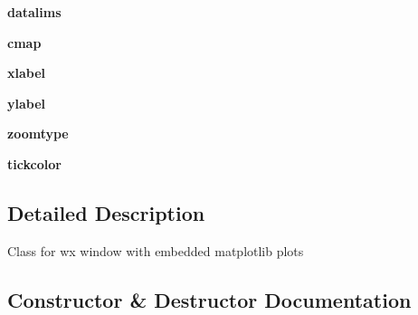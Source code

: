 \begin{DoxyCompactItemize}
\item 
\hypertarget{class_uni_dec_1_1unidec__modules_1_1_plotting_window_1_1_plotting_window_ad1ec773f6c983880193a921cdec6b974}{}{\bfseries datalims}\label{class_uni_dec_1_1unidec__modules_1_1_plotting_window_1_1_plotting_window_ad1ec773f6c983880193a921cdec6b974}

\item 
\hypertarget{class_uni_dec_1_1unidec__modules_1_1_plotting_window_1_1_plotting_window_a2095290ee1011cd826574972f802fb9e}{}{\bfseries cmap}\label{class_uni_dec_1_1unidec__modules_1_1_plotting_window_1_1_plotting_window_a2095290ee1011cd826574972f802fb9e}

\item 
\hypertarget{class_uni_dec_1_1unidec__modules_1_1_plotting_window_1_1_plotting_window_a8ccd55b8d1edfb1c4c6bfb1b3858cc62}{}{\bfseries xlabel}\label{class_uni_dec_1_1unidec__modules_1_1_plotting_window_1_1_plotting_window_a8ccd55b8d1edfb1c4c6bfb1b3858cc62}

\item 
\hypertarget{class_uni_dec_1_1unidec__modules_1_1_plotting_window_1_1_plotting_window_a3a236ee84b84a2f3fa77a2a2e4247fe5}{}{\bfseries ylabel}\label{class_uni_dec_1_1unidec__modules_1_1_plotting_window_1_1_plotting_window_a3a236ee84b84a2f3fa77a2a2e4247fe5}

\item 
\hypertarget{class_uni_dec_1_1unidec__modules_1_1_plotting_window_1_1_plotting_window_aaeeeec6814f8ea063a9fa3ee2a4d305e}{}{\bfseries zoomtype}\label{class_uni_dec_1_1unidec__modules_1_1_plotting_window_1_1_plotting_window_aaeeeec6814f8ea063a9fa3ee2a4d305e}

\item 
\hypertarget{class_uni_dec_1_1unidec__modules_1_1_plotting_window_1_1_plotting_window_ab819a5e0cbfde2720a25e02fb75fccb0}{}{\bfseries tickcolor}\label{class_uni_dec_1_1unidec__modules_1_1_plotting_window_1_1_plotting_window_ab819a5e0cbfde2720a25e02fb75fccb0}

\end{DoxyCompactItemize}


\subsection{Detailed Description}
\begin{DoxyVerb}Class for wx window with embedded matplotlib plots
\end{DoxyVerb}
 

\subsection{Constructor \& Destructor Documentation}
\hypertarget{class_uni_dec_1_1unidec__modules_1_1_plotting_window_1_1_plotting_window_a069041d1fdaf8d1c2015295218703a3c}{}
